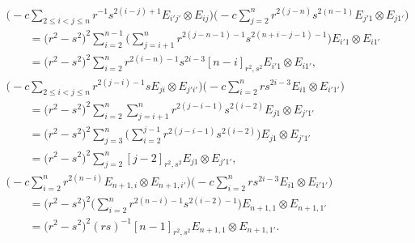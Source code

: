 \documentclass[pdftex]{sigma}
\numberwithin{equation}{section}
\begin{document}
\begin{gather}
\\
 \Biggl(-c\sum_{2 \le i < j \le n}r^{-1}s^{2(i - j) + 1}E_{i'j'} \otimes E_{ij} \Biggr)\Biggl(-c\sum_{j = 2}^{n}r^{2(j - n)}s^{2(n - 1)}E_{j'1} \otimes E_{j1'} \Biggr) \nonumber\\
 \qquad{}=
 \bigl(r^{2} - s^{2}\bigr)^{2}\sum_{i = 2}^{n-1}\Biggl(\sum_{j = i + 1}^{n}r^{2(j - n - 1) - 1}s^{2(n + i - j - 1) - 1}\Biggr)E_{i'1} \otimes E_{i1'} \nonumber\\
 \qquad{}=
 \bigl(r^{2} - s^{2}\bigr)^{2}\sum_{i = 2}^{n}r^{2(i - n) - 1}s^{2i - 3}[n - i]_{r^{2},s^{2}}E_{i'1} \otimes E_{i1'},\label{eq:term_e}
\\
 \Biggl(-c\sum_{2 \le i < j \le n}r^{2(j - i) - 1}sE_{ji} \otimes E_{j'i'} \Biggr)\Biggl(-c\sum_{i = 2}^{n}rs^{2i - 3}E_{i1} \otimes E_{i'1'}\Biggr) \nonumber\\
 \qquad{}=
 \bigl(r^{2} - s^{2}\bigr)^{2}\sum_{i = 2}^{n}\sum_{j = i + 1}^{n}r^{2(j - i - 1)}s^{2(i -2)}E_{j1} \otimes E_{j'1'} \nonumber\\
 \qquad{}=
 \bigl(r^{2} - s^{2}\bigr)^{2}\sum_{j = 3}^{n}\Biggl( \sum_{i = 2}^{j - 1}r^{2(j - i - 1)}s^{2(i - 2)}\Biggr) E_{j1} \otimes E_{j'1'} \nonumber\\
 \qquad{}=
 \bigl(r^{2} - s^{2}\bigr)^{2}\sum_{j = 2}^{n}[j - 2]_{r^{2},s^{2}}E_{j1} \otimes E_{j'1'},\label{eq:term_f}
\\
 \Biggl(-c\sum_{i = 2}^{n}r^{2(n - i)}E_{n + 1,i} \otimes E_{n + 1,i'} \Biggr) \Biggl(-c\sum_{i = 2}^{n}rs^{2i - 3}E_{i1} \otimes E_{i'1'}\Biggr) \nonumber\\
 \qquad{}=
 \bigl(r^{2} - s^{2}\bigr)^{2}\Biggl(\sum_{i = 2}^{n}r^{2(n - i) - 1}s^{2(i - 2) - 1}\Biggr)E_{n+1,1} \otimes E_{n + 1,1'} \nonumber\\
 \qquad{}=
 \bigl(r^{2} - s^{2}\bigr)^{2}(rs)^{-1}[n - 1]_{r^{2},s^{2}}E_{n + 1,1} \otimes E_{n + 1,1'}.\label{eq:term_g}
\end{gather}
\end{document}
